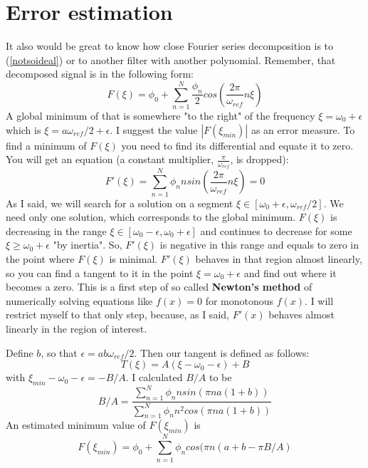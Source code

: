 \documentclass[a4paper,11pt,fleqn]{article}
\let\oldref\ref
\renewcommand{\ref}[1]{(\oldref{#1})}
\begin{document}
\section{Error estimation}
It also would be great to know how close Fourier series decomposition is to \ref{notsoideal} or to another filter with another polynomial. Remember, that decomposed signal is in the following form:
\begin{equation}
F(\xi) = \phi_{0} + \sum_{n=1}^{N}\frac{\phi_{n}}{2}cos(\frac{2\pi}{\omega_{ref}}n\xi)
\end{equation}
A global minimum of that is somewhere "to the right" of the frequency $\xi = \omega_{0}+\epsilon$ which is $\xi = a\omega_{ref}/2+\epsilon$. I suggest the value $\left|F(\xi_{min})\right|$ as an error measure. To find
a minimum of $F(\xi)$ you need to find its differential and equate it to zero. You will get an equation (a constant multiplier, $\frac{\pi}{\omega_{ref}}$, is dropped):
\begin{equation}
F'(\xi) = \sum_{n=1}^{N}\phi_{n}n sin(\frac{2 \pi}{\omega_{ref}}n\xi) = 0
\end{equation}
As I said, we will search for a solution on a segment $\xi \in [\omega_{0}+\epsilon, \omega_{ref}/2]$. We need only one solution, which corresponds to the global minimum. $F(\xi)$ is decreasing in the range
$\xi \in [\omega_{0}-\epsilon, \omega_{0}+\epsilon]$ and continues to decrease for some $\xi \geq \omega_{0} + \epsilon$ "by inertia". So, $F'(\xi)$ is negative in this range and equals to zero in the point where
$F(\xi)$ is minimal. $F'(\xi)$ behaves in that region almost linearly, so you can find a tangent to it in the point $\xi = \omega_{0} + \epsilon$ and find out where it becomes a zero. This is a first step of so called
\textbf{Newton's method} of numerically solving equations like $f(x)=0$ for monotonous $f(x)$. I will restrict myself to that only step, because, as I said, $F'(x)$ behaves almost linearly in the region of interest.

Define $b$, so that $\epsilon = ab\omega_{ref}/2$. Then our tangent is defined as follows:
\begin{equation}
T(\xi) = A(\xi - \omega_{0} - \epsilon) + B
\end{equation}
with $\xi_{min} - \omega_{0} - \epsilon = -B/A$. I calculated $B/A$ to be
\begin{equation}
B/A = \frac{\sum_{n=1}^{N}\phi_{n}n sin(\pi n a (1 + b))}{\sum_{n=1}^{N}\phi_{n}n^{2}cos(\pi n a (1 + b))}
\end{equation}
An estimated minimum value of $F(\xi_{min})$ is
\begin{equation}
F(\xi_{min}) = \phi_{0} + \sum_{n=1}^{N}\phi_{n}cos(\pi n (a+b-\pi B/A)
\end{equation}
\end{document}
